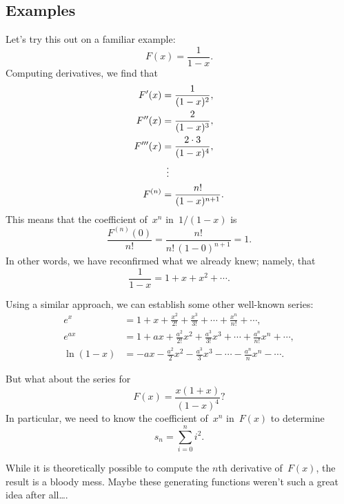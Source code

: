 \subsection{Examples}

Let's try this out on a familiar example:
\begin{equation*}
    F(x) = \frac{1}{1 - x}.
\end{equation*}
Computing derivatives, we find that
\begin{align*}
F'(x)   & = \frac{1}{(1 - x)^2}, \\
F''(x)  & = \frac{2}{(1 - x)^3}, \\
F'''(x) & = \frac{2 \cdot 3}{(1 - x)^4}, \\
        & \enskip\vdots \\
F^{(n)} & = \frac{n!}{(1 - x)^{n + 1}}. 
\end{align*}
This means that the coefficient of~$x^n$ in~$1/(1 - x)$ is
\begin{equation*}
\frac{F^{(n)}(0)}{n!}
    = \frac{n!}{n!\, (1 - 0)^{n + 1}}
    = 1.
\end{equation*}
In other words, we have reconfirmed what we already knew; namely, that
\begin{equation*}
    \frac{1}{1 - x} = 1 + x + x^2 + \cdots.
\end{equation*}

Using a similar approach, we can establish some other well-known
series:
\begingroup
{}
\begin{align*}
e^x
    &= 1 + x + \frac{x^2}{2!} + \frac{x^3}{3!} + \cdots +
        \frac{x^n}{n!} + \cdots, \\
%
e^{ax}
    &= 1 + ax + \frac{a^2}{2!} x^2 + \frac{a^3}{3!} x^3 + \cdots +
        \frac{a^n}{n!} x^n + \cdots, \\
%
\ln(1 - x)
    &= -a x - \frac{a^2}{2} x^2 - \frac{a^3}{3} x^3 - \cdots 
        - \frac{a^n}{n} x^n - \cdots.
\end{align*}
\endgroup

But what about the series for
\begin{equation}\label{eqn:12D}
    F(x) = \frac{x (1 + x)}{(1 - x)^4} ?
\end{equation}
In particular, we need to know the coefficient of~$x^n$ in~$F(x)$ to
determine
\begin{equation*}
    s_n = \sum_{i = 0}^n i^2.
\end{equation*}

While it is theoretically possible to compute the $n$th derivative
of~$F(x)$, the result is a bloody mess.  Maybe these generating
functions weren't such a great idea after all\dots.

